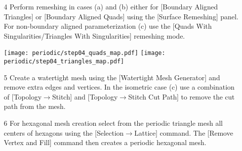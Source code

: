 \documentclass[Thesis.tex]{subfiles}
\begin{document}
\begin{itemize}
\begin{center}
\begin{minipage}{0.9\linewidth}
            \centering
\end{minipage}
\end{center}    

\item[4] Perform remeshing in cases (a) and (b) either for [Boundary Aligned Triangles] or [Boundary Aligned Quads] using the [Surface Remeshing] panel. For non-boundary aligned parameterization (c) use the [Quads With Singularities/Triangles With Singularities] remeshing mode.\\

\begin{center}
\begin{minipage}{0.9\linewidth}
            \centering
            \texttt{[image: periodic/step04\_quads\_map.pdf]}
            \texttt{[image: periodic/step04\_triangles\_map.pdf]}
\end{minipage}
\end{center}    

\item[5] Create a watertight mesh using the [Watertight Mesh Generator] and remove extra edges and vertices. In the isometric case (c) use a combination of [Topology$\to$Stitch] and [Topology$\to$Stitch Cut Path] to remove the cut path from the mesh.
\item[6] For hexagonal mesh creation select from the periodic triangle mesh all centers of hexagons using the [Selection$\to$Lattice] command. The [Remove Vertex and Fill] command then creates a periodic hexagonal mesh.
\begin{center}
\begin{minipage}{0.9\linewidth}
            \centering
\end{minipage}
\end{center}                
\end{itemize}
\end{document}
